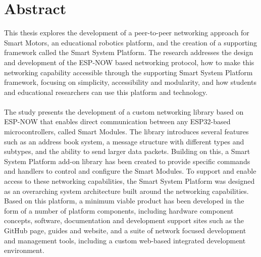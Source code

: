 \chapter*{Abstract}%
%
%
%

This thesis explores the development of a peer-to-peer networking approach for Smart Motors, an educational robotics platform, and the creation of a supporting framework called the Smart System Platform. The research addresses the design and development of the ESP-NOW based networking protocol, how to make this networking capability accessible through the supporting Smart System Platform framework, focusing on simplicity, accessibility and modularity, and how students and educational researchers can use this platform and technology. \\\\

The study presents the development of a custom networking library based on ESP-NOW that enables direct communication between any ESP32-based microcontrollers, called Smart Modules. The library introduces several features such as an address book system, a message structure with different types and subtypes, and the ability to send larger data packets. Building on this, a Smart System Platform add-on library has been created to provide specific commands and handlers to control and configure the Smart Modules. To support and enable access to these networking capabilities, the Smart System Platform was designed as an overarching system architecture built around the networking capabilities. Based on this platform, a minimum viable product has been developed in the form of a number of platform components, including hardware component concepts, software, documentation and development support sites such as the GitHub page, guides and website, and a suite of network focused development and management tools, including a custom web-based integrated development environment. \\\\

